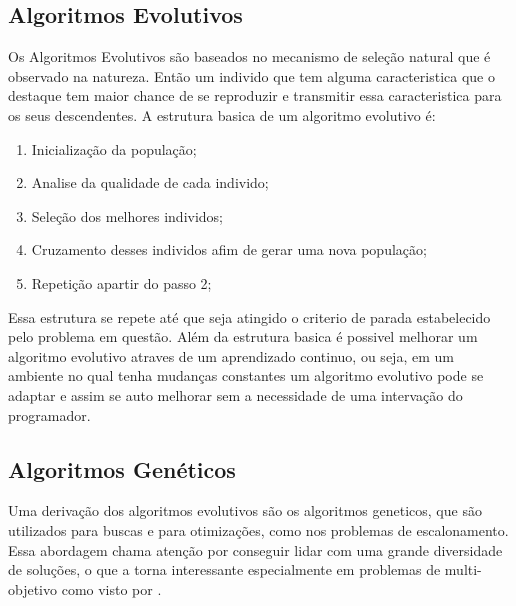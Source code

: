     \subsection{Algoritmos Evolutivos}
        Os Algoritmos Evolutivos são baseados no mecanismo de seleção natural que é observado na natureza. Então um individo que tem alguma caracteristica que o destaque tem maior chance de se reproduzir e transmitir essa caracteristica para os seus descendentes.\newline
        A estrutura basica de um algoritmo evolutivo é:
        \begin{enumerate}
            \item Inicialização da população;
            \item Analise da qualidade de cada individo;
            \item Seleção dos melhores individos;
            \item Cruzamento desses individos afim de gerar uma nova população;
            \item Repetição apartir do passo 2;
        \end{enumerate}
        Essa estrutura se repete até que seja atingido o criterio de parada estabelecido pelo problema em questão.\newline
        Além da estrutura basica é possivel melhorar um algoritmo evolutivo atraves de um aprendizado continuo, ou seja, em um ambiente no qual tenha mudanças constantes um algoritmo evolutivo pode se adaptar e assim se auto melhorar sem a necessidade de uma intervação do programador.


    \subsection{Algoritmos Genéticos}
        Uma derivação dos algoritmos evolutivos são os algoritmos geneticos, que são utilizados para buscas e para otimizações, como nos problemas de escalonamento. Essa abordagem chama atenção por conseguir lidar com uma grande diversidade de soluções, o que a torna interessante especialmente em problemas de multi-objetivo como visto por \cite{Bagchi1999}.\newline
        
